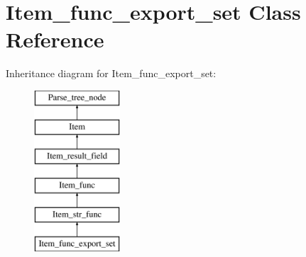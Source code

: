 \hypertarget{classItem__func__export__set}{}\section{Item\+\_\+func\+\_\+export\+\_\+set Class Reference}
\label{classItem__func__export__set}
Inheritance diagram for Item\+\_\+func\+\_\+export\+\_\+set\+:\begin{figure}[H]
\begin{center}
\leavevmode
\includegraphics[height=6.000000cm]{classItem__func__export__set}
\end{center}
\end{figure}
